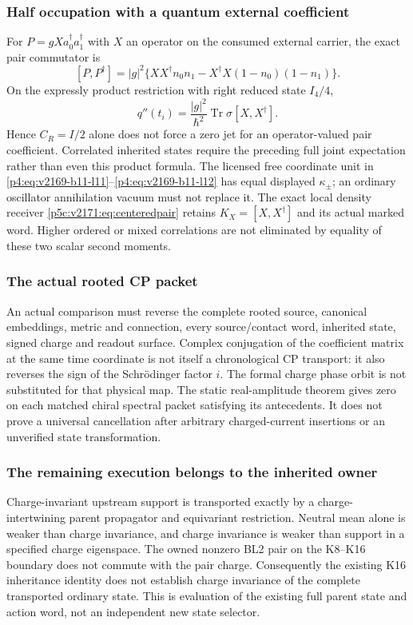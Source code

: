 \documentclass[11pt,a4paper]{article}
\begin{document}
\subsubsection{Half occupation with a quantum external coefficient}
For \(P=gX a_0^\dagger a_1^\dagger\) with \(X\) an operator on the
consumed external carrier, the exact pair commutator is
\[
 [P,P^\dagger]=|g|^2\{
 XX^\dagger n_0n_1-X^\dagger X(1-n_0)(1-n_1)\}.
\]
On the expressly product restriction with right reduced state \(I_4/4\),
\begin{equation}
 q''(t_i)=\frac{|g|^2}{\hbar^2}
                    \operatorname{Tr}\sigma[X,X^\dagger].
 \label{p5c:v2188:eq:operatorhalfguard}
\end{equation}
Hence \(C_R=I/2\) alone does not force a zero jet for an operator-valued
pair coefficient. Correlated inherited states require the preceding
full joint expectation rather than even this product formula.
The licensed free coordinate unit in
\ref{p4:eq:v2169-b11-l11}--\ref{p4:eq:v2169-b11-l12} has equal
displayed \(\kappa_\pm\); an ordinary oscillator annihilation vacuum
must not replace it. The exact local density receiver
\ref{p5c:v2171:eq:centeredpair} retains \(K_X=[X,X^\dagger]\) and
its actual marked word. Higher ordered or mixed correlations are not
eliminated by equality of these two scalar second moments.

\subsubsection{The actual rooted CP packet}
An actual comparison must reverse the complete rooted source, canonical
embeddings, metric and connection, every source/contact word, inherited
state, signed charge and readout surface. Complex conjugation of the
coefficient matrix at the same time coordinate is not itself a
chronological CP transport: it also reverses the sign of the Schr\"odinger
factor \(i\). The formal charge phase orbit is not substituted for that
physical map. The static real-amplitude theorem gives zero on each
matched chiral spectral packet satisfying its antecedents. It does not
prove a universal cancellation after arbitrary charged-current
insertions or an unverified state transformation.

\subsubsection{The remaining execution belongs to the inherited owner}
Charge-invariant upstream support is transported exactly by a
charge-intertwining parent propagator and equivariant restriction.
Neutral mean alone is weaker than charge invariance, and charge
invariance is weaker than support in a specified charge eigenspace.
The owned nonzero BL2 pair on the K8--K16 boundary does not commute with
the pair charge. Consequently the existing K16 inheritance identity
does not establish charge invariance of the complete transported
ordinary state. This is evaluation of the existing full parent state
and action word, not an independent new state selector.
\end{document}
